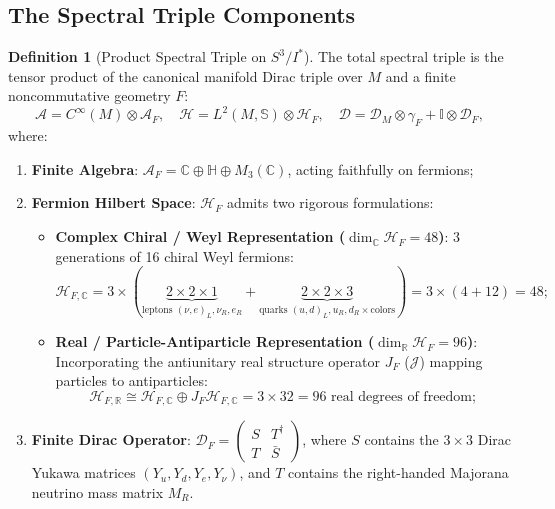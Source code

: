 \documentclass[11pt,a4paper]{article}
\theoremstyle{definition}
\newtheorem{definition}[theorem]{Definition}
\newcommand{\R}{\mathbb{R}}
\newcommand{\C}{\mathbb{C}}
\newcommand{\HH}{\mathbb{H}}
\newcommand{\PDS}{S^3 / I^*}
\newcommand{\cD}{\mathcal{D}}
\newcommand{\cH}{\mathcal{H}}
\newcommand{\cA}{\mathcal{A}}
\begin{document}
\subsection{The Spectral Triple Components}
\begin{definition}[Product Spectral Triple on $\PDS$]
The total spectral triple is the tensor product of the canonical manifold Dirac triple over $M$ and a finite noncommutative geometry $F$:
\begin{equation}
    \cA = C^\infty(M) \otimes \cA_F, \quad \cH = L^2(M, \mathbb{S}) \otimes \cH_F, \quad \cD = \cD_M \otimes \gamma_F + \mathbb{I} \otimes \cD_F,
\end{equation}
where:
\begin{enumerate}
    \item \textbf{Finite Algebra}: $\cA_F = \C \oplus \HH \oplus M_3(\C)$, acting faithfully on fermions;
    \item \textbf{Fermion Hilbert Space}: $\cH_F$ admits two rigorous formulations:
    \begin{itemize}
        \item \textbf{Complex Chiral / Weyl Representation ($\dim_\C \cH_F = 48$)}: 3 generations of 16 chiral Weyl fermions:
        \begin{equation}
            \cH_{F,\C} = 3 \times (\underbrace{2 \times 2 \times 1}_{\text{leptons } (\nu,e)_L, \nu_R, e_R} + \underbrace{2 \times 2 \times 3}_{\text{quarks } (u,d)_L, u_R, d_R \times \text{colors}}) = 3 \times (4 + 12) = 48;
        \end{equation}
        \item \textbf{Real / Particle-Antiparticle Representation ($\dim_\R \cH_F = 96$)}: Incorporating the antiunitary real structure operator $J_F$ ($\mathcal{J}$) mapping particles to antiparticles:
        \begin{equation}
            \cH_{F,\R} \cong \cH_{F,\C} \oplus J_F \cH_{F,\C} = 3 \times 32 = 96 \text{ real degrees of freedom};
        \end{equation}
    \end{itemize}
    \item \textbf{Finite Dirac Operator}: $\cD_F = \begin{pmatrix} S & T^\dagger \\ T & \bar{S} \end{pmatrix}$, where $S$ contains the $3 \times 3$ Dirac Yukawa matrices $(Y_u, Y_d, Y_e, Y_\nu)$, and $T$ contains the right-handed Majorana neutrino mass matrix $M_R$.
\end{enumerate}
\end{definition}
\end{document}
